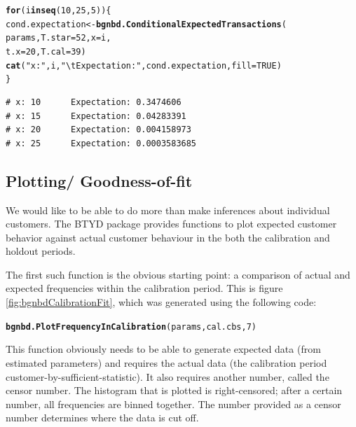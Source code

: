 \documentclass[10pt, letterpaper, onecolumn, oneside, final]{article}\usepackage[]{graphicx}\usepackage[]{color}
\makeatletter
\newcommand{\hlnum}[1]{\textcolor[rgb]{0.686,0.059,0.569}{#1}}%
\newcommand{\hlstr}[1]{\textcolor[rgb]{0.192,0.494,0.8}{#1}}%
\newcommand{\hlstd}[1]{\textcolor[rgb]{0.345,0.345,0.345}{#1}}%
\newcommand{\hlkwa}[1]{\textcolor[rgb]{0.161,0.373,0.58}{\textbf{#1}}}%
\newcommand{\hlkwb}[1]{\textcolor[rgb]{0.69,0.353,0.396}{#1}}%
\newcommand{\hlkwc}[1]{\textcolor[rgb]{0.333,0.667,0.333}{#1}}%
\newcommand{\hlkwd}[1]{\textcolor[rgb]{0.737,0.353,0.396}{\textbf{#1}}}%
\newenvironment{kframe}{%
 \def\at@end@of@kframe{}%
 \ifinner\ifhmode%
  \def\at@end@of@kframe{\end{minipage}}%
  \begin{minipage}{\columnwidth}%
 \fi\fi%
 \def\FrameCommand##1{\hskip\@totalleftmargin \hskip-\fboxsep
 \colorbox{shadecolor}{##1}\hskip-\fboxsep
     \hskip-\linewidth \hskip-\@totalleftmargin \hskip\columnwidth}%
 \MakeFramed {\advance\hsize-\width
   \@totalleftmargin\z@ \linewidth\hsize
   \@setminipage}}%
 {\par\unskip\endMakeFramed%
 \at@end@of@kframe}
\newenvironment{knitrout}{}{} %
\makeatother
\begin{document}
\begin{knitrout}
\color{fgcolor}\begin{kframe}
\begin{alltt}
\hlkwa{for} \hlstd{(i} \hlkwa{in} \hlkwd{seq}\hlstd{(}\hlnum{10}\hlstd{,} \hlnum{25}\hlstd{,} \hlnum{5}\hlstd{))\{}
  \hlstd{cond.expectation} \hlkwb{<-} \hlkwd{bgnbd.ConditionalExpectedTransactions}\hlstd{(}
                        \hlstd{params,} \hlkwc{T.star} \hlstd{=} \hlnum{52}\hlstd{,} \hlkwc{x} \hlstd{= i,}
                        \hlkwc{t.x} \hlstd{=} \hlnum{20}\hlstd{,} \hlkwc{T.cal} \hlstd{=} \hlnum{39}\hlstd{)}
  \hlkwd{cat} \hlstd{(}\hlstr{"x:"}\hlstd{,i,}\hlstr{"\textbackslash{}t Expectation:"}\hlstd{,cond.expectation,} \hlkwc{fill} \hlstd{=} \hlnum{TRUE}\hlstd{)}
\hlstd{\}}
\end{alltt}
\begin{verbatim}
# x: 10 	 Expectation: 0.3474606
# x: 15 	 Expectation: 0.04283391
# x: 20 	 Expectation: 0.004158973
# x: 25 	 Expectation: 0.0003583685
\end{verbatim}
\end{kframe}
\end{knitrout}

\subsection{Plotting/ Goodness-of-fit}
\label{subsec:bgnbdPlotting}
We would like to be able to do more than make inferences about
individual customers. The BTYD package provides functions to plot
expected customer behavior against actual customer behaviour in the
both the calibration and holdout periods.

The first such function is the obvious starting point: a comparison of
actual and expected frequencies within the calibration period. This is
figure \ref{fig:bgnbdCalibrationFit}, which was generated using the
following code:

\begin{knitrout}
\color{fgcolor}\begin{kframe}
\begin{alltt}
\hlkwd{bgnbd.PlotFrequencyInCalibration}\hlstd{(params, cal.cbs,} \hlnum{7}\hlstd{)}
\end{alltt}
\end{kframe}
\end{knitrout}

This function obviously needs to be able to generate expected data
(from estimated parameters) and requires the actual data (the
calibration period customer-by-sufficient-statistic).  It also
requires another number, called the censor number. The histogram that
is plotted is right-censored; after a certain number, all frequencies
are binned together. The number provided as a censor number determines
where the data is cut off.
\end{document}
